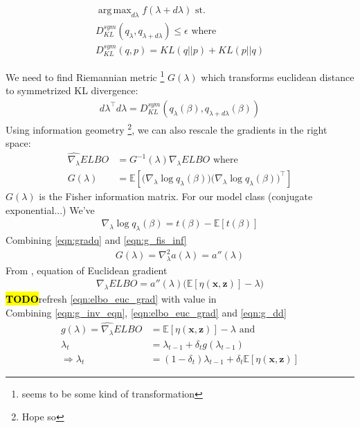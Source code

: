 \documentclass[letterpaper]{article}
\newcommand{\TODO}{\hl{\textbf{TODO}}}
\newcommand{\comment}[1]{\textcolor{OliveGreen}{#1}}
\DeclareMathOperator*{\argmax}{arg\,max}
\newcommand{\bx}{\mathbf{x}}
\newcommand{\bz}{\mathbf{z}}
\newcommand{\EE}[1]{\mathbb{E}\left[#1\right]}
\begin{document}
  \begin{align}
    \argmax_{d\lambda} f(\lambda + d\lambda) \text{ st. } \\\nonumber
    D^{sym}_{KL}(q_{\lambda}, q_{\lambda + d\lambda}) \leq \epsilon \text{ where } \\\nonumber
    D^{sym}_{KL}(q, p) = KL(q||p) + KL(p||q)
  \end{align}

  We need to find Riemannian metric \footnote{seems to be some kind of transformation}
  $G(\lambda)$ which transforms euclidean distance to symmetrized KL divergence:
  \begin{align}
    d\lambda^\intercal d\lambda = D^{sym}_{KL}(q_{\lambda}(\beta), q_{\lambda + d\lambda}(\beta))
  \end{align}
  Using information geometry \footnote{Hope so}, we can also rescale the gradients
  in the right space:
  \begin{align}
    \label{eqn:g_inv_eqn}
    \hat{\nabla_{\lambda}}ELBO &= G^{-1}(\lambda)\nabla_{\lambda}ELBO \text{ where } \\
    G(\lambda) &= \EE{{\Big(\nabla_{\lambda} \log q_{\lambda} (\beta) \Big)}
                      {\Big(\nabla_{\lambda} \log q_{\lambda} (\beta) \Big)}^\intercal}
                    \label{eqn:g_fis_inf}
  \end{align}
  $G(\lambda)$ is the Fisher information matrix. For our model class (conjugate exponential...)
  We've
  \begin{align} \label{eqn:gradq}
    \nabla_{\lambda} \log q_{\lambda} (\beta) = t(\beta) - \EE{t(\beta)}
  \end{align}
  Combining \ref{eqn:gradq} and \ref{eqn:g_fis_inf}
  \begin{align}
    G(\lambda) = \nabla_{\lambda}^{2}a(\lambda) = a{''}(\lambda) \label{eqn:g_dd}
  \end{align}
  From \cite{hoffman2013stochastic}, equation of Euclidean gradient
  \begin{align}
    \nabla_{\lambda}ELBO = a{''}(\lambda)\Big(\EE{\eta(\bx, \bz)} - \lambda\Big)
    \label{eqn:elbo_euc_grad}
  \end{align}
  \TODO \comment{refresh \ref{eqn:elbo_euc_grad} with value in \cite{blei2016variational}} \\
  Combining \ref{eqn:g_inv_eqn}, \ref{eqn:elbo_euc_grad} and \ref{eqn:g_dd}
  \begin{align}
    g(\lambda) = \widehat{\nabla_{\lambda}}ELBO &= \EE{\eta(\bx, \bz)} - \lambda \text{ and } \nonumber\\
    \lambda_t &= \lambda_{t - 1} + \delta_t g(\lambda_{t - 1}) \nonumber\\
    \Rightarrow \lambda_t &= (1 - \delta_t)\lambda_{t - 1} +  \delta_t  \EE{\eta(\bx, \bz)} 
  \end{align}
\end{document}
